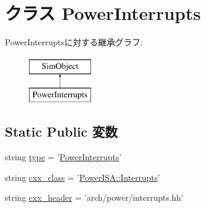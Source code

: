 \hypertarget{classPowerInterrupts_1_1PowerInterrupts}{
\section{クラス PowerInterrupts}
\label{classPowerInterrupts_1_1PowerInterrupts}
}
PowerInterruptsに対する継承グラフ:\begin{figure}[H]
\begin{center}
\leavevmode
\includegraphics[height=2cm]{classPowerInterrupts_1_1PowerInterrupts}
\end{center}
\end{figure}
\subsection*{Static Public 変数}
\begin{DoxyCompactItemize}
\item 
string \hyperlink{classPowerInterrupts_1_1PowerInterrupts_acce15679d830831b0bbe8ebc2a60b2ca}{type} = '\hyperlink{classPowerInterrupts_1_1PowerInterrupts}{PowerInterrupts}'
\item 
string \hyperlink{classPowerInterrupts_1_1PowerInterrupts_a58cd55cd4023648e138237cfc0822ae3}{cxx\_\-class} = '\hyperlink{classPowerISA_1_1Interrupts}{PowerISA::Interrupts}'
\item 
string \hyperlink{classPowerInterrupts_1_1PowerInterrupts_a17da7064bc5c518791f0c891eff05fda}{cxx\_\-header} = 'arch/power/interrupts.hh'
\end{DoxyCompactItemize}


